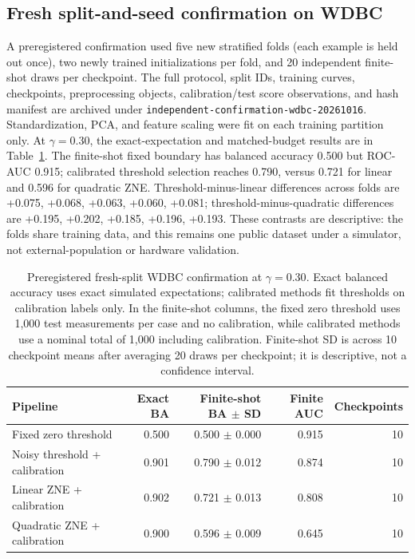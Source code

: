 \documentclass[conference]{IEEEtran}
\begin{document}
\subsection{Fresh split-and-seed confirmation on WDBC}
A preregistered confirmation used five new stratified folds (each example is held out once), two newly trained initializations per fold, and 20 independent finite-shot draws per checkpoint. The full protocol, split IDs, training curves, checkpoints, preprocessing objects, calibration/test score observations, and hash manifest are archived under \texttt{independent-confirmation-wdbc-20261016}. Standardization, PCA, and feature scaling were fit on each training partition only. At $\gamma=0.30$, the exact-expectation and matched-budget results are in Table~\ref{tab:fresh-confirmation}. The finite-shot fixed boundary has balanced accuracy 0.500 but ROC-AUC 0.915; calibrated threshold selection reaches 0.790, versus 0.721 for linear and 0.596 for quadratic ZNE. Threshold-minus-linear differences across folds are +0.075, +0.068, +0.063, +0.060, +0.081; threshold-minus-quadratic differences are +0.195, +0.202, +0.185, +0.196, +0.193. These contrasts are descriptive: the folds share training data, and this remains one public dataset under a simulator, not external-population or hardware validation.
\begin{table}[t]\centering\small
\caption{Preregistered fresh-split WDBC confirmation at $\gamma=0.30$. Exact balanced accuracy uses exact simulated expectations; calibrated methods fit thresholds on calibration labels only. In the finite-shot columns, the fixed zero threshold uses 1,000 test measurements per case and no calibration, while calibrated methods use a nominal total of 1,000 including calibration. Finite-shot SD is across 10 checkpoint means after averaging 20 draws per checkpoint; it is descriptive, not a confidence interval.}
\label{tab:fresh-confirmation}
\begin{tabular}{@{}l r r r r@{}}\toprule
Pipeline & Exact BA & Finite-shot BA $\pm$ SD & Finite AUC & Checkpoints \\ \midrule
Fixed zero threshold & 0.500 & 0.500 $\pm$ 0.000 & 0.915 & 10 \\
Noisy threshold + calibration & 0.901 & 0.790 $\pm$ 0.012 & 0.874 & 10 \\
Linear ZNE + calibration & 0.902 & 0.721 $\pm$ 0.013 & 0.808 & 10 \\
Quadratic ZNE + calibration & 0.900 & 0.596 $\pm$ 0.009 & 0.645 & 10 \\
\bottomrule\end{tabular}\end{table}
\end{document}
